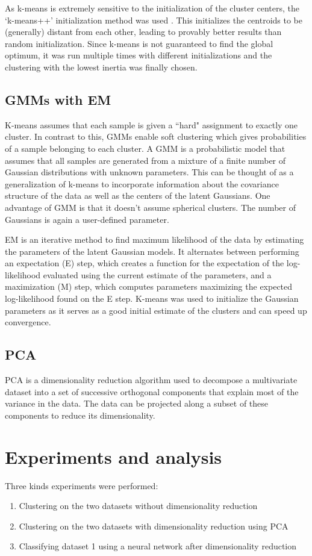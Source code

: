\documentclass[letterpaper]{article}
\begin{document}
	As k-means is extremely sensitive to the initialization of the cluster centers, the `k-means++' initialization method was used \cite{arthurKmeansAdvantagesCareful2007}. This initializes the centroids to be (generally) distant from each other, leading to provably better results than random initialization. Since k-means is not guaranteed to find the global optimum, it was run multiple times with different initializations and the clustering with the lowest inertia was finally chosen.
	
	\subsection{GMMs with EM}
	K-means assumes that each sample is given a ``hard" assignment to exactly one cluster. In contrast to this, GMMs enable soft clustering which gives probabilities of a sample belonging to each cluster. A GMM is a probabilistic model that assumes that all samples are generated from a mixture of a finite number of Gaussian distributions with unknown parameters. This can be thought of as a generalization of k-means to incorporate information about the covariance structure of the data as well as the centers of the latent Gaussians. One advantage of GMM is that it doesn't assume spherical clusters. The number of Gaussians is again a user-defined parameter.
	
	EM is an iterative method to find maximum likelihood of the data by estimating the parameters of the latent Gaussian models. It alternates between performing an expectation (E) step, which creates a function for the expectation of the log-likelihood evaluated using the current estimate of the parameters, and a maximization (M) step, which computes parameters maximizing the expected log-likelihood found on the E step. K-means was used to initialize the Gaussian parameters as it serves as a good initial estimate of the clusters and can speed up convergence.
	
	\subsection{PCA}
	PCA is a dimensionality reduction algorithm used to decompose a multivariate dataset into a set of successive orthogonal components that explain most of the variance in the data. The data can be projected along a subset of these components to reduce its dimensionality.
	
	\section{Experiments and analysis}
	Three kinds experiments were performed:
	\begin{enumerate}
		\item Clustering on the two datasets without dimensionality reduction
		\item Clustering on the two datasets with dimensionality reduction using PCA
		\item Classifying dataset 1 using a neural network after dimensionality reduction
	\end{enumerate}
\end{document}
